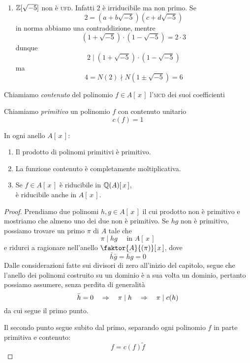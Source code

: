 \begin{multicols}{2}
\begin{enumerate}
	\item $ \mathbb{Z}[\sqrt{-5}] $ non è \textsc{ufd}. Infatti $ 2 $ è irriducibile ma non primo.
	Se \[ 2 = (a+b\sqrt{-5})(c + d\sqrt{-5}) \] in norma abbiamo una contraddizione, mentre
	\[ (1 + \sqrt{-5})\cdot (1 - \sqrt{-5}) = 2 \cdot 3 \]
	dunque \[ 2 \mid (1 + \sqrt{-5})\cdot (1 - \sqrt{-5})  \] ma
	\[ 4 = N(2) \nmid N(1 \pm \sqrt{-5}) = 6 \]
	
\end{enumerate}

\begin{definition}
	Chiamiamo \emph{contenuto} del polinomio $ f \in A[\,x\,] $ l'\textsc{mcd} dei suoi coefficienti
\end{definition}

\begin{definition}
	Chiamiamo \emph{primitivo} un polinomio $ f $ con contenuto unitario
	\[ c(f) = 1 \]
\end{definition}
\begin{theorem}\label{LemmaGauss}
	In ogni anello $ A[\,x\,] $:
	\begin{enumerate}
	\item Il prodotto di polinomi primitivi è primitivo.
	\item La funzione contenuto è completamente moltiplicativa.
	\item Se $ f \in A[\,x\,] $ è riducibile in $ \mathbb{Q}(A)[\,x\,] $,\\ è riducibile anche in $ A[\,x\,] $.
	\end{enumerate}
	
\end{theorem}
\begin{proof}
	Prendiamo due polinomi $ h, g \in A[\,x\,] $ il cui prodotto non è primitivo e mostriamo che almeno uno dei due non è primitivo. Se $ hg $ non è primitivo, possiamo trovare un primo $ \pi $ di $ A $ tale che
	\[ \pi \mid hg \quad\text{ in } A[\,x\,] \]
	e ridurci a ragionare nell'anello $ \faktor{A}{(\pi)}[\,x\,] $, dove
	\[ \bar{h}\bar{g} = \overline{hg} = 0 \]
	 Dalle considerazioni fatte sui divisori di zero all'inizio del capitolo, segue che l'anello dei polinomi costruito su un dominio è a sua volta un dominio, pertanto possiamo assumere, senza perdita di generalità
	 \[ \bar{h} = 0 \quad\Rightarrow\quad \pi \mid h \quad\Rightarrow\quad \pi \mid c(h) \]
	 da cui segue il primo punto.
	 
	 Il secondo punto segue subito dal primo, separando ogni polinomio $ f $ in parte primitiva e contenuto:
	 \[ f = c(f) \tilde{f} \]
	 

\end{proof}
\end{multicols}
